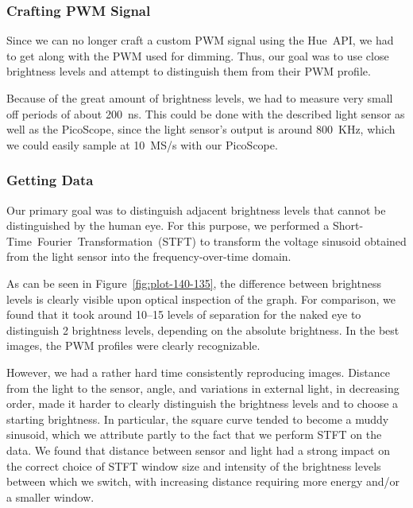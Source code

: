 \subsubsection{Crafting PWM Signal}

Since we can no longer craft a custom PWM signal using the Hue~API, we had to get along with the PWM used for dimming.
Thus, our goal was to use close brightness levels and attempt to distinguish them from their PWM profile.

Because of the great amount of brightness levels, we had to measure very small off periods of about 200~ns. This could be done with the described light sensor as well as the PicoScope, since the light sensor's output is around 800~KHz, which we could easily sample at 10~MS/s with our PicoScope.

\subsubsection{Getting Data}
Our primary goal was to distinguish adjacent brightness levels that cannot be distinguished by the human eye.
For this purpose, we performed a Short-Time~Fourier~Transformation~(STFT) to transform the voltage sinusoid obtained from the light sensor into the frequency-over-time domain.

As can be seen in Figure~\ref{fig:plot-140-135}, the difference between brightness levels is clearly visible upon optical inspection of the graph.
For comparison, we found that it took around 10--15 levels of separation for the naked eye to distinguish 2 brightness levels, depending on the absolute brightness.
In the best images, the PWM profiles were clearly recognizable.

However, we had a rather hard time consistently reproducing images.
Distance from the light to the sensor, angle, and variations in external light, in decreasing order, made it harder to clearly distinguish the brightness levels and to choose a starting brightness.
In particular, the square curve tended to become a muddy sinusoid, which we attribute partly to the fact that we perform STFT on the data.
We found that distance between sensor and light had a strong impact on the correct choice of STFT window size and intensity of the brightness levels between which we switch, with increasing distance requiring more energy and/or a smaller window.


